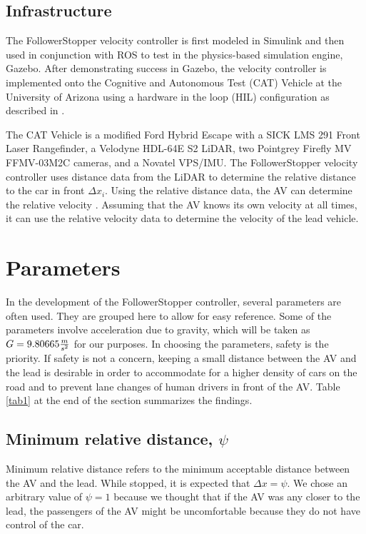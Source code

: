 \documentclass[conference]{IEEEtran}
\begin{document}
\subsection{Infrastructure}
The FollowerStopper velocity controller is first modeled in Simulink and then used in conjunction with ROS to test in the physics-based simulation engine, Gazebo. After demonstrating success in Gazebo, the velocity controller is implemented onto the Cognitive and Autonomous Test (CAT) Vehicle at the University of Arizona using a hardware in the loop (HIL) configuration as described in \cite{bhadani2018cat}.

\hspace{0.01 in}The CAT Vehicle is a modified Ford Hybrid Escape with a SICK LMS 291 Front Laser Rangefinder, a Velodyne HDL-64E S2 LiDAR, two Pointgrey Firefly MV FFMV-03M2C cameras, and a Novatel VPS/IMU. The FollowerStopper velocity controller uses distance data from the LiDAR to determine the relative distance to the car in front $\Delta x_i$. Using the relative distance data, the AV can determine the relative velocity \cite{bhadani2019real}. Assuming that the AV knows its own velocity at all times, it can use the relative velocity data to determine the velocity of the lead vehicle.






\section{Parameters}
In the development of the FollowerStopper controller, several parameters are often used. They are grouped here to allow for easy reference. Some of the parameters involve acceleration due to gravity, which will be taken as $G=9.80665 {m\over s^2}$ for our purposes. In choosing the parameters, safety is the priority. If safety is not a concern, keeping a small distance between the AV and the lead is desirable in order to accommodate for a higher density of cars on the road and to prevent lane changes of human drivers in front of the AV. Table \ref{tab1} at the end of the section summarizes the findings.
 
\subsection{Minimum relative distance, $\psi$}
Minimum relative distance refers to the minimum acceptable distance between the AV and the lead. While stopped, it is expected that $\Delta x= \psi$. We chose an arbitrary value of $\psi=1$ because we thought that if the AV was any closer to the lead, the passengers of the AV might be uncomfortable because they do not have control of the car. 
\end{document}
